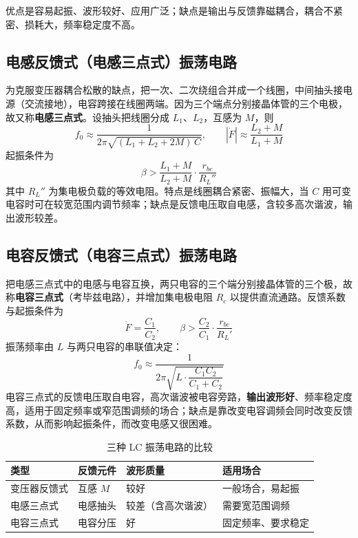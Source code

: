 优点是容易起振、波形较好、应用广泛；缺点是输出与反馈靠磁耦合，耦合不紧密、损耗大，频率稳定度不高。

\subsection{电感反馈式（电感三点式）振荡电路}
为克服变压器耦合松散的缺点，把一次、二次绕组合并成一个线圈，中间抽头接电源（交流接地），电容跨接在线圈两端。因为三个端点分别接晶体管的三个电极，故又称\textbf{电感三点式}。设抽头把线圈分成 $L_1$、$L_2$，互感为 $M$，则
\begin{equation}
f_0\approx\frac{1}{2\pi\sqrt{(L_1+L_2+2M)\,C}},\qquad
|\dot F|\approx\frac{L_2+M}{L_1+M}
\end{equation}
起振条件为
\begin{equation}
\beta>\frac{L_1+M}{L_2+M}\cdot\frac{r_{be}}{R_L''}
\end{equation}
其中 $R_L''$ 为集电极负载的等效电阻。特点是线圈耦合紧密、振幅大，当 $C$ 用可变电容时可在较宽范围内调节频率；缺点是反馈电压取自电感，含较多高次谐波，输出波形较差。

\subsection{电容反馈式（电容三点式）振荡电路}
把电感三点式中的电感与电容互换，两只电容的三个端分别接晶体管的三个极，故称\textbf{电容三点式}（考毕兹电路），并增加集电极电阻 $R_c$ 以提供直流通路。反馈系数与起振条件为
\begin{equation}
\dot F=\frac{C_1}{C_2},\qquad
\beta>\frac{C_2}{C_1}\cdot\frac{r_{be}}{R_L'}
\end{equation}
振荡频率由 $L$ 与两只电容的串联值决定：
\begin{equation}
f_0\approx\frac{1}{2\pi\sqrt{L\cdot\dfrac{C_1C_2}{C_1+C_2}}}
\end{equation}
电容三点式的反馈电压取自电容，高次谐波被电容旁路，\textbf{输出波形好}、频率稳定度高，适用于固定频率或窄范围调频的场合；缺点是靠改变电容调频会同时改变反馈系数，从而影响起振条件，而改变电感又很困难。

\begin{table}[htbp]
\centering
\caption{三种 LC 振荡电路的比较}
\begin{tabular}{@{}llll@{}}
\hline
类型 & 反馈元件 & 波形质量 & 适用场合 \\
\hline
变压器反馈式 & 互感 $M$ & 较好 & 一般场合，易起振 \\
电感三点式 & 电感抽头 & 较差（含高次谐波） & 需要宽范围调频 \\
电容三点式 & 电容分压 & 好 & 固定频率、要求稳定 \\
\hline
\end{tabular}
\end{table}

